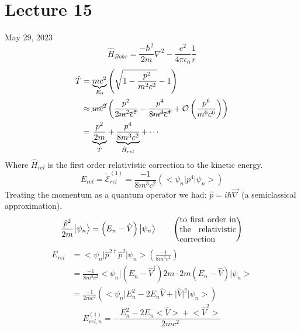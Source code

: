 \documentclass[12pt,fancychapters]{report}
\numberwithin{equation}{section}
\begin{document}
\section{Lecture 15}
May 29, 2023
\[
  \hat{H}_{Bohr} = \frac{-\hbar^2}{2m}\nabla^2 - \frac{e^2}{4\pi \epsilon_0}\frac{1}{r}
\]
\begin{align*}
  \hat{T} &= \underbrace{mc^2}_{E_0}\left(\sqrt{1 - \frac{p^2}{m^2c^2}}-1\right)\\
          &\approx \cancel{mc^2}\left(\frac{p^2}{2\cancel{m^2c^2}} - \frac{p^4}{8\cancel{
          m^4c^4}}+ \mathcal{O}\left(\frac{p^6}{m^6c^6}\right)\right)\\
          &= \underbrace{\frac{p^2}{2m}}_{\hat{T}} + 
          \underbrace{\frac{p^4}{8m^3c^2}}_{\hat{H}_{rel}} + \cdots
\end{align*}
Where $\hat{H}_{rel}$ is the first order relativistic correction to the kinetic energy.
\[
  E_{rel} = \tilde{\mathcal{E}}^{(1)}_{rel} = \frac{-1}{8m^3c^2}\left(
  \big<\psi_n\big|p^4\big|\psi_n \big>\right)
\]
Treating the momentum as a quantum operator we had: $\hat{p}=i\hbar\vec{\nabla}$ (a 
semiclassical approximation).
\[
  \frac{\hat{p}^2}{2m}\big|\psi_n\big> = \left(E_n - \hat{V} \right)\big|\psi_n\big> \qquad
  \left(\parbox{0.2\textwidth}{to first order in the relativistic correction}\right)
\]
\begin{align*}
  E_{rel} &= \big<\psi_n\big|\hat{p}^{2\dagger}\hat{p}^2\big|\psi_n \big>
  \left(\frac{-1}{8m^3c^2}\right)\\
  &= \frac{-1}{8m^3c^2}\big<\psi_n\big|(E_n - \hat{V}^\dagger)2m\cdot 2m(E_n-\hat{V})
  \big|\psi_n\big>\\
  &= \frac{-1}{2mc^2}\left(\big<\psi_n\big|E_n^2 - 2E_n\hat{V} + 
  \big|\hat{V}\big|^2\big|\psi_n\big>\right)
\end{align*}
\[
  E_{rel,n}^{(1)} = -\frac{E_n^2 - 2E_n\big<\hat{V}\big> + \big<\hat{V}^2\big>}{2mc^2}
\]
\end{document}
